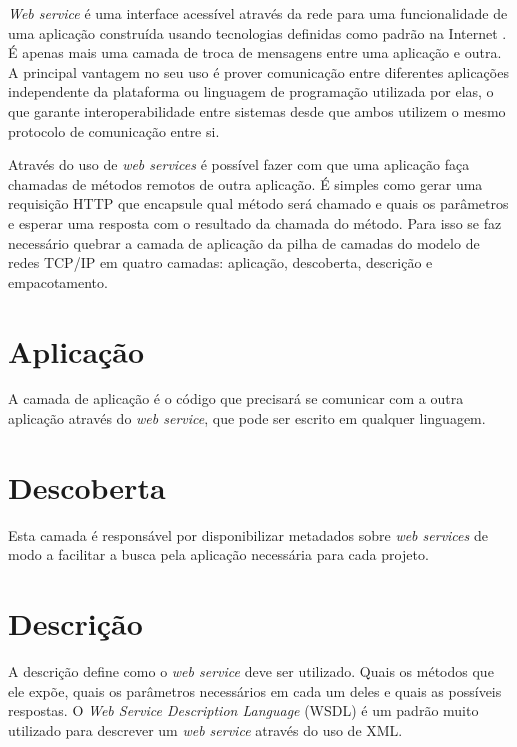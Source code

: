\label{Cap:web_services}

\textit{Web service} é uma interface acessível através da rede para uma funcionalidade de uma aplicação construída usando tecnologias definidas como padrão na Internet \cite{ref-oreilly-soap}. É apenas mais uma camada de troca de mensagens entre uma aplicação e outra. A principal vantagem no seu uso é prover comunicação entre diferentes aplicações independente da plataforma ou linguagem de programação utilizada por elas, o que garante interoperabilidade entre sistemas desde que ambos utilizem o mesmo protocolo de comunicação entre si.

Através do uso de \textit{web services} é possível fazer com que uma aplicação faça chamadas de métodos remotos de outra aplicação. É simples como gerar uma requisição HTTP que encapsule qual método será chamado e quais os parâmetros e esperar uma resposta com o resultado da chamada do método. Para isso se faz necessário quebrar a camada de aplicação da pilha de camadas do modelo de redes TCP/IP em quatro camadas: aplicação, descoberta, descrição e empacotamento.

\section{Aplicação}

A camada de aplicação é o código que precisará se comunicar com a outra aplicação através do \textit{web service}, que pode ser escrito em qualquer linguagem.

\section{Descoberta}

Esta camada é responsável por disponibilizar metadados sobre \textit{web services} de modo a facilitar a busca pela aplicação necessária para cada projeto.

\section{Descrição}

A descrição define como o \textit{web service} deve ser utilizado. Quais os métodos que ele expõe, quais os parâmetros necessários em cada um deles e quais as possíveis respostas. O \textit{Web Service Description Language} (WSDL) é um padrão muito utilizado para descrever um \textit{web service} através do uso de XML.


